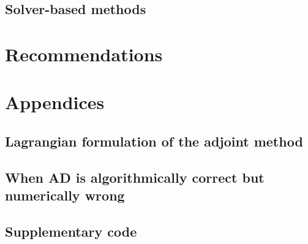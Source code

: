 \documentclass[12pt]{article}
\begin{document}
\subsection{Solver-based methods}
\label{section:solver-methods}



\section{Recommendations}


% 


% 

\newpage
\appendix
\section*{Appendices}
\renewcommand{\thesubsection}{\Alph{subsection}}

% 
\subsection{Lagrangian formulation of the adjoint method}

\newpage
\subsection{When AD is algorithmically correct but numerically wrong}

\newpage
\subsection{Supplementary code}



\newpage

\printbibliography[heading=bibintoc, title={References}]
\end{document}
